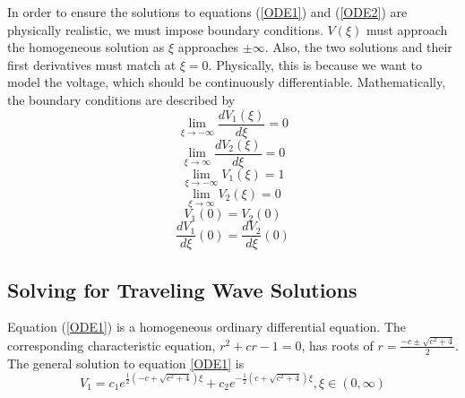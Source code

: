 \documentclass[12pt]{article}
\begin{document}
In order to ensure the solutions to equations (\ref{ODE1}) and (\ref{ODE2}) are physically realistic, we must impose boundary conditions. $V(\xi)$ must approach the homogeneous solution as $\xi$ approaches $\pm \infty$. Also, the two solutions and their first derivatives must match at $\xi=0$. Physically, this is because we want to model the voltage, which should be continuously differentiable. Mathematically, the boundary conditions are described by\\
$$\lim_{\xi\to-\infty} \frac{d V_1(\xi)}{d \xi}=0$$
$$\lim_{\xi\to\infty} \frac{d V_2(\xi)}{d \xi}=0$$
$$\lim_{\xi\to-\infty} V_1(\xi)=1$$
$$\lim_{\xi\to\infty} V_2(\xi)=0$$
$$V_1(0)=V_2(0)$$
$$\frac{d V_1}{d \xi}(0)=\frac{d V_2}{d \xi}(0)$$


\subsection{Solving for Traveling Wave Solutions}

Equation (\ref{ODE1}) is a homogeneous ordinary differential equation. The corresponding characteristic equation, $r^2+cr-1=0$, has roots of  $r=\frac{-c \pm \sqrt{c^2+4}}{2}$. The general solution to equation \ref{ODE1} is 
\begin{equation}
\label{ODE1 general solution}
V_{1}=c_1 e^{\frac{1}{2}(-c+\sqrt{c^2+4})\xi}+c_2e^{-\frac{1}{2}(c+\sqrt{c^2+4})\xi}, \xi \in (0,\infty)
\end{equation}
\end{document}
